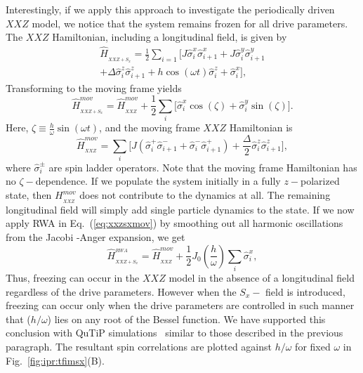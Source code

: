 \documentclass[%
reprint,
superscriptaddress,
amsmath,amssymb,
aps,
prb,
showkeys,
]{revtex4-2}
\begin{document}
Interestingly, if we apply this approach to investigate the periodically driven $XXZ$ model, we notice that the system remains frozen for all drive parameters. The $XXZ$ Hamiltonian, including a longitudinal field, is given by
\begin{multline}
	\hat{H}_{_{XXZ+S_{x}}} = \frac12 \sum_{i=1} \bigg[ J \hat{\sigma}^x_i \hat{\sigma}^x_{i+1} +J  \hat{\sigma}^y_i \hat{\sigma}^y_{i+1}\\ + \Delta  \hat{\sigma}^z_i \hat{\sigma}^z_{i+1} + h\cos(\omega t)  \hat{\sigma}^z_i + \hat{\sigma}^x_i\bigg],
	\label{eq:xxzsx}
\end{multline}
Transforming to the moving frame  yields
\begin{equation}
\hat{H}_{_{XXZ+S_{x}}}^{mov} =\hat{H}_{_{XXZ}}^{mov} +  \frac12 \sum_i\Big[ \hat{\sigma}^x_i \cos(\zeta) + \hat{\sigma}^y_i \sin(\zeta)\Big].
\label{eq:xxzsxmov}
\end{equation}
Here, $\zeta \equiv \frac{h}{\omega}\sin(\omega t)$, and the moving frame $XXZ$ Hamiltonian is
\begin{equation}
\hat{H}_{_{XXZ}}^{mov} =  \sum_i\Bigg[J\left(\hat{\sigma}^+_i \hat{\sigma}^-_{i+1} + \hat{\sigma}^-_i \hat{\sigma}^+_{i+1}\right) + \frac{\Delta}{2} \hat{\sigma}^z_i \hat{\sigma}^z_{i+1}\Bigg],
\end{equation}
where $\hat{\sigma}^\pm_i$ are spin ladder operators. Note that the moving frame Hamiltonian has no $\zeta-$dependence. If we populate the system initially in a  fully $z-$polarized state, then $H_{_{XXZ}}^{mov}$ does not contribute to the dynamics at all. The remaining longitudinal field  will simply add single particle dynamics to the state. If we now apply RWA in Eq.~(\ref{eq:xxzsxmov}) by smoothing out all harmonic oscillations from the Jacobi -Anger expansion, we get
\begin{equation}
\hat{H}_{_{XXZ+S_{x}}}^{_{RWA}} = \hat{H}_{_{XXZ}}^{mov} +  \frac12 J_0 \left(\frac{h}{\omega}\right)\sum_i \hat{\sigma}^x_i,
\label{eq:xxz_sx_rwa}
\end{equation}
Thus, freezing can occur in the $XXZ$ model in the absence of a longitudinal field regardless of the drive parameters. However when the $S_x-$ field is introduced, freezing can occur only when the drive parameters are controlled in such manner that ($h/\omega$) lies on any root of the Bessel function. We have supported this conclusion with QuTiP simulations~\cite{qutip} similar to those described in the previous paragraph. The resultant spin correlations are plotted against $h/\omega$ for fixed $\omega$ in Fig.~\ref{fig:ipr:tfimsx}(B). 
\end{document}
